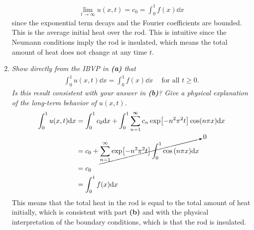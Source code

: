 \documentclass[paper=a4, fontsize=11pt]{scrartcl} %
\theoremstyle{plain}
\numberwithin{equation}{section} %
\numberwithin{figure}{section} %
\numberwithin{table}{section} %
\begin{document}
\begin{enumerate}[\bf (a)]
        \begin{align*}
            \lim_{t\rightarrow\infty}u(x,t) = c_0 = \int_0^1 f(x) \dd x
        \end{align*}
        since the exponential term decays and the Fourier coefficients are bounded.  This is the average initial heat over the rod.  This is intuitive since the Neumann conditions imply the rod is insulated, which means the total amount of heat does not change at any time $t$.
    \item
        \emph{Show directly from the IBVP in \textbf{(a)} that}
        \begin{align*}
            \int_0^1 u(x, t) \dd x = \int_0^1 f(x) \dd x\ \ \ \ \text{ for all }t \geq 0.
        \end{align*}
        \emph{Is this result consistent with your answer in \textbf{(b)}?  Give a physical explanation of the long-term behavior of $u(x,t)$.} \\

        \begin{align*}
            \int_0^1 u(x,t) \dd x &= \int_0^1 c_0 \dd x + \int_0^1\sum_{n=1}^\infty c_n \exp[-n^2\pi^2 t]\cos(n\pi x) \dd x \\
            &= c_0 + \cancelto{0}{\sum_{n=1}^\infty\exp[-n^2\pi^2 t]\int_0^1 \cos\qty(n\pi x)\dd x} \\
            &= c_0 \\
            &= \int_0^1 f(x) \dd x
        \end{align*}
        This means that the total heat in the rod is equal to the total amount of heat initially, which is consistent with part \textbf{(b)} and with the physical interpretation of the boundary conditions, which is that the rod is insulated.
\end{enumerate}
\end{document}
